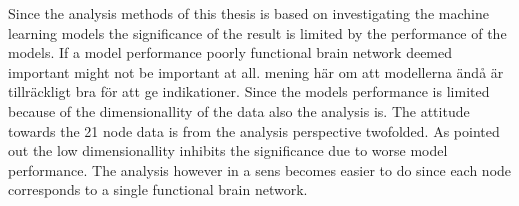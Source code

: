 Since the analysis methods of this thesis is based on investigating the machine learning models the significance of the result is limited by the performance of the models. If a model performance poorly functional brain network deemed important might not be important at all. mening här om att modellerna ändå är tillräckligt bra för att ge indikationer. Since the models performance is limited because of the dimensionallity of the data also the analysis is. The attitude towards the 21 node data is from the analysis perspective twofolded. As pointed out the low dimensionallity inhibits the significance due to worse model performance. The analysis however in a sens becomes easier to do since each node corresponds to a single functional brain network. 















